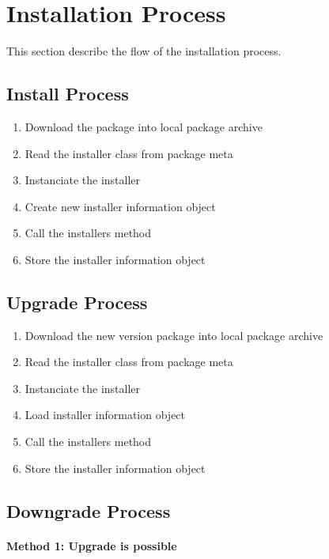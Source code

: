 \section[sec:installation process]{Installation Process}

This section describe the flow of the installation process.


\subsection[sec:install process]{Install Process}

\begin{enumerate}
\item Download the package into local package archive
\item Read the installer class from package meta
\item Instanciate the installer
\item Create new installer information object
\item Call the installers  method
\item Store the installer information object
\end{enumerate}

\subsection[sec:upgrade process]{Upgrade Process}

\begin{enumerate}
\item Download the new version package into local package archive
\item Read the installer class from package meta
\item Instanciate the installer
\item Load installer information object
\item Call the installers  method
\item Store the installer information object
\end{enumerate}

\subsection[sec:downgrade process]{Downgrade Process}

\paragraph{Method 1: Upgrade is possible}

